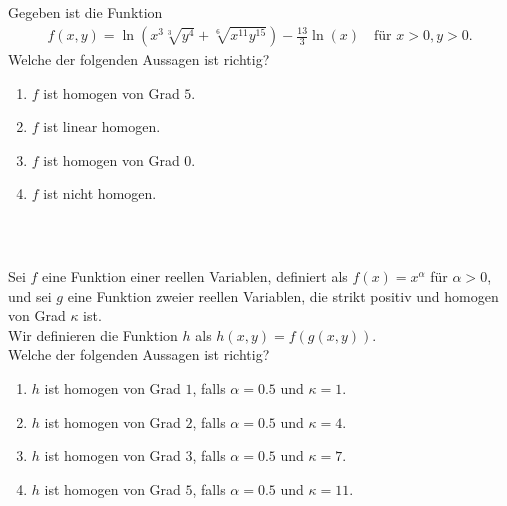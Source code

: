\subsection*{}
Gegeben ist die Funktion
\begin{align*}
	f(x,y) 
	=
	\ln\left(
	x^3 \sqrt[3]{y^4} + \sqrt[6]{x^{11} y^{15}}
	\right)
	- \frac{13}{3} \ln(x) \quad \textrm{für } x>0,y>0.
\end{align*}
Welche der folgenden Aussagen ist richtig?
\renewcommand{\labelenumi}{(\alph{enumi})}
\begin{enumerate}
\item
$ f  $ ist homogen von Grad $ 5 $.
\item
$ f $ ist linear homogen.	
\item 
$ f  $ ist homogen von Grad $ 0 $.
\item
$ f $ ist nicht homogen.
\end{enumerate}
\ \\
\subsection*{}
Sei $ f $ eine Funktion einer reellen Variablen, definiert als $ f(x) = x^\alpha $ für $ \alpha > 0 $, und sei $ g $ eine Funktion zweier reellen Variablen, die strikt positiv und homogen von Grad $ \kappa $ ist.\\
Wir definieren die Funktion $ h $ als $ h(x,y)  = f(g(x,y))$.\\
Welche der folgenden Aussagen ist richtig?
\renewcommand{\labelenumi}{(\alph{enumi})}
\begin{enumerate}
	\item 
	$ h $ ist homogen von Grad $ 1 $, falls $ \alpha =0.5 $ und $ \kappa = 1 $.
	\item
	$ h $ ist homogen von Grad $ 2 $, falls $ \alpha =0.5 $ und $ \kappa = 4 $.
	\item
	$ h $ ist homogen von Grad $ 3 $, falls $ \alpha =0.5 $ und $ \kappa = 7 $.
	\item
	$ h $ ist homogen von Grad $ 5 $, falls $ \alpha =0.5 $ und $ \kappa = 11 $.
\end{enumerate}